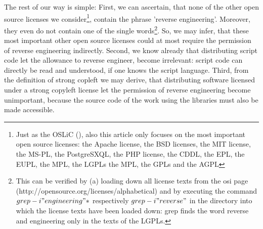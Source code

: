 %
%
%
%
%

The rest of our way is simple: First, we can ascertain, that none of the other
open source licenses we consider\footnote{Just as the OSLiC (), also this
article only focuses on the most important open source licenses: the Apache
license, the BSD licenses, the MIT license, the MS-PL, the PostgreSXQL, the PHP
license, the CDDL, the EPL, the EUPL, the MPL, the LGPLs the MPL, the GPLs and
the AGPL}, contain the phrase 'reverse engineering'. Moreover, they even do not
contain one of the single words\footnote{This can be verified by (a) loading
down all license texts from the osi page
(http://opensource.org/licenses/alphabetical) and by executing the command $grep
-i "engineering" *$ respectively $grep -i "reverse"$ in the directory into which
the license texts have been loaded down: grep finds the word reverse and
engineering only in the texts of the LGPLs.}. So, we may infer, that these most
important other open source licenses could at most require the permission of
reverse engineering indirectly. Second, we know already that distributing script
code let the allowance to reverse engineer, become irrelevant: script code can
directly be read and understood, if one knows the script language. Third, from
the definition of strong copleft we may derive, that distributing software
licensed under a strong copyleft license let the permission of reverse
engineering become unimportant, because the source code of the work using the
libraries must also be made accessible.


